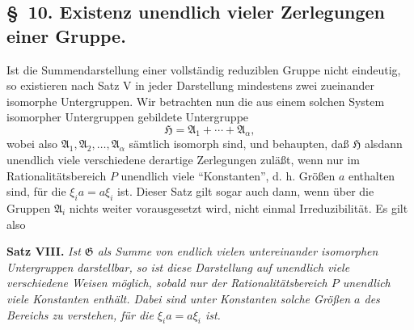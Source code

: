 \documentclass[11pt]{article}
\begin{document}
\subsection*{\S~10. Existenz unendlich vieler Zerlegungen einer Gruppe.}

Ist die Summendarstellung einer vollständig reduziblen Gruppe nicht eindeutig, so existieren nach Satz V in jeder Darstellung mindestens zwei zueinander isomorphe Untergruppen. Wir betrachten nun die aus einem solchen System isomorpher Untergruppen gebildete Untergruppe
\[
  \mathfrak H=\mathfrak A_1+\cdots+\mathfrak A_\alpha,
\]
wobei also $\mathfrak A_1,\mathfrak A_2,\ldots,\mathfrak A_\alpha$ sämtlich isomorph sind, und behaupten, daß $\mathfrak H$ alsdann unendlich viele verschiedene derartige Zerlegungen zuläßt, wenn nur im Rationalitätsbereich $P$ unendlich viele ``Konstanten'', d. h. Größen $a$ enthalten sind, für die $\xi_i a=a\xi_i$ ist. Dieser Satz gilt sogar auch dann, wenn über die Gruppen $\mathfrak A_i$ nichts weiter vorausgesetzt wird, nicht einmal Irreduzibilität. Es gilt also

\textbf{Satz VIII.} \emph{Ist $\mathfrak G$ als Summe von endlich vielen untereinander isomorphen Untergruppen darstellbar, so ist diese Darstellung auf unendlich viele verschiedene Weisen möglich, sobald nur der Rationalitätsbereich $P$ unendlich viele Konstanten enthält. Dabei sind unter Konstanten solche Größen $a$ des Bereichs zu verstehen, für die $\xi_i a=a\xi_i$ ist.}
\end{document}
